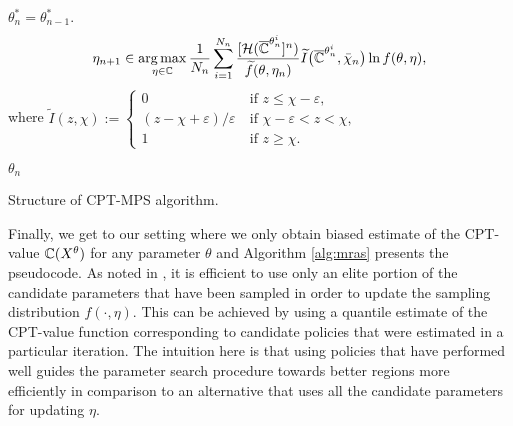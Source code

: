 \begin{algorithm}
\begin{algorithmic}
          $\theta^*_{n} \!=\! \theta^*_{n-1}$.\label{step:3c}
	      \EndIf
         \EndIf
	\EndThresholding
	    \Update
		                         \begin{align*} 
\eta_{n+1} \in \mathop{\rm arg\,max}_{\eta \in \mathbb{C}}\frac{1}{N_n}\sum_{i=1}^{N_n}\frac{[\mathcal{H}(\overline {\mathbb{C}}^{\theta^i_n}]^n)}{\widetilde f(\theta,\eta_n)}
\widetilde I\big(\overline {\mathbb{C}}^{\theta^i_n},\bar \chi_{n}\big) \ln f(\theta,\eta),
                            \end{align*}
                            where $\widetilde I(z,\chi):=\left\{\begin{array}{ll}
                                                          0 & ~\mbox{if $z\leq \chi-\varepsilon$,} \\
									    (z-\chi+\varepsilon)/ \varepsilon & ~\mbox{if $\chi-\varepsilon<z<\chi$,}\\
                                                          1 & ~\mbox{if $z\geq \chi$.}
                                                          \end{array} \right.$

		\EndUpdate
\EndFor
{} $\theta_n$
\end{algorithmic}
\caption{Structure of  CPT-MPS algorithm.}
\label{alg:mras}
\end{algorithm}



Finally, we get to our setting where we only obtain biased estimate
of the CPT-value $\mathbb{C}(X^{\theta})$ for any parameter $\theta$ and Algorithm \ref{alg:mras} presents the pseudocode.
As noted in \cite{chang2013simulation}, it is efficient to use only an elite portion of the candidate parameters that have been sampled in order to update the sampling distribution $f(\cdot,\eta)$. This can be achieved by using a quantile estimate of the CPT-value function corresponding to candidate policies that were estimated in a particular iteration. The intuition here is that using policies that have performed well guides the parameter search procedure towards better regions more efficiently in comparison to an alternative that uses all the candidate parameters for updating $\eta$.

